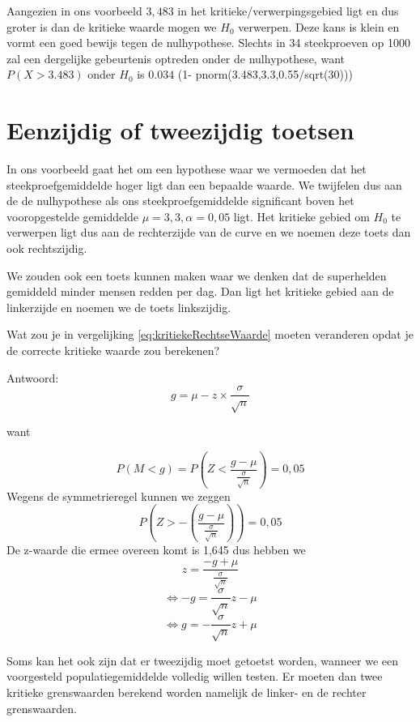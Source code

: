 Aangezien in ons voorbeeld $3,483$ in het kritieke/verwerpingsgebied ligt en dus groter is dan de kritieke waarde mogen we $H_{0}$ verwerpen. Deze kans is klein en vormt een goed bewijs tegen de nulhypothese. Slechts in 34 steekproeven op 1000 zal een dergelijke gebeurtenis optreden onder de nulhypothese, want 
$P(X>3.483) $ onder $H_0$ is $0.034$ (1- pnorm(3.483,3.3,0.55/sqrt(30)))


\section{Eenzijdig of tweezijdig toetsen}

In ons voorbeeld gaat het om een hypothese waar we vermoeden dat het steekproefgemiddelde hoger ligt dan een bepaalde waarde. We twijfelen dus aan de de nulhypothese als ons steek\-proef\-gemiddelde significant boven het vooropgestelde gemiddelde $\mu = 3,3, \alpha = 0,05$ ligt. Het kritieke gebied om $H_{0}$ te verwerpen ligt dus aan de rechterzijde van de curve en we noemen deze toets dan ook rechtszijdig.

We zouden ook een toets kunnen maken waar we denken dat de superhelden gemiddeld minder mensen redden per dag. Dan ligt het kritieke gebied aan de linkerzijde en noemen we de toets linkszijdig.
\begin{exercise}
  Wat zou je in vergelijking \ref{eq:kritiekeRechtseWaarde} moeten veranderen opdat je de correcte kritieke waarde zou berekenen?
\end{exercise}

Antwoord:
\begin{equation}
  g = \mu - z \times \frac{\sigma}{\sqrt{n}}
  \label{eq:kritiekeRechtseWaarde2}
\end{equation}

want

\[ P(M < g) = P\left(Z < \frac{g - \mu}{\frac{\sigma}{\sqrt{n}}}\right) = 0,05 \]
Wegens de symmetrieregel kunnen we zeggen
\[ P\left(Z > - \left( \frac{g - \mu}{\frac{\sigma}{\sqrt{n}}} \right) \right) = 0,05 \]
De z-waarde die ermee overeen komt is 1,645 dus hebben we
\[ z = \frac{-g + \mu}{\frac{\sigma}{\sqrt{n}}} \]
\[ \Leftrightarrow -g = \frac{\sigma}{\sqrt{n}} z - \mu \]
\[ \Leftrightarrow g = -\frac{\sigma}{\sqrt{n}} z + \mu \]

Soms kan het ook zijn dat er tweezijdig moet getoetst worden, wanneer we een voorgesteld populatiegemiddelde volledig willen testen. Er moeten dan twee kritieke grenswaarden berekend worden namelijk de linker- en de rechter grenswaarden.

